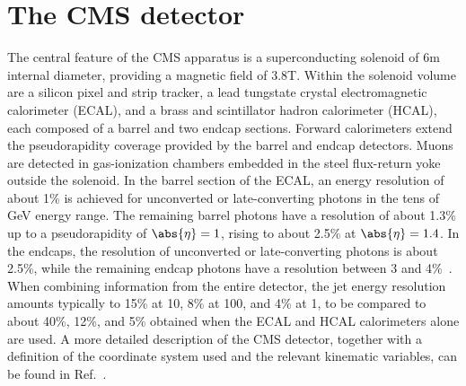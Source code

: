 \section{The CMS detector}


The central feature of the CMS apparatus is a superconducting solenoid of 6\unit{m} internal diameter, providing a magnetic field of 3.8\unit{T}. Within the solenoid volume are a silicon pixel and strip tracker, a lead tungstate crystal electromagnetic calorimeter (ECAL), and a brass and scintillator hadron calorimeter (HCAL), each composed of a barrel and two endcap sections. Forward calorimeters extend the pseudorapidity coverage provided by the barrel and endcap detectors. Muons are detected in gas-ionization chambers embedded in the steel flux-return yoke outside the solenoid. In the barrel section of the ECAL, an energy resolution of about 1\% is achieved for unconverted or late-converting photons in the tens of GeV energy range. The remaining barrel photons have a resolution of about 1.3\% up to a pseudorapidity of $\abs{\eta} = 1$, rising to about 2.5\% at $\abs{\eta} = 1.4$. In the endcaps, the resolution of unconverted or late-converting photons is about 2.5\%, while the remaining endcap photons have a resolution between 3 and 4\%~\cite{CMS:EGM-14-001}. When combining information from the entire detector, the jet energy resolution amounts typically to 15\% at 10\GeV, 8\% at 100\GeV, and 4\% at 1\TeV, to be compared to about 40\%, 12\%, and 5\% obtained when the ECAL and HCAL calorimeters alone are used. A more detailed description of the CMS detector, together with a definition of the coordinate system used and the relevant kinematic variables, can be found in Ref.~\cite{Chatrchyan:2008zzk}.
